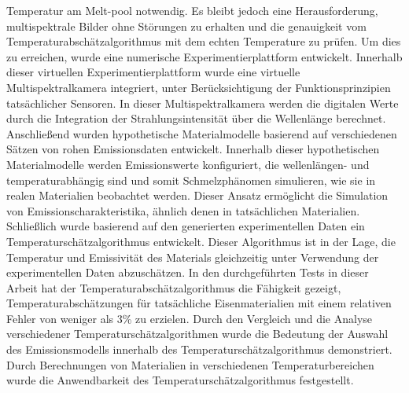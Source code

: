 {	Temperatur am Melt-pool notwendig. Es bleibt jedoch eine Herausforderung, multispektrale 
	Bilder ohne Störungen zu erhalten und die genauigkeit vom Temperaturabschätzalgorithmus mit dem 
	echten Temperature zu prüfen. Um dies zu erreichen, wurde eine numerische 
	Experimentierplattform entwickelt. Innerhalb dieser virtuellen Experimentierplattform 
	wurde eine virtuelle Multispektralkamera integriert, unter Berücksichtigung der 
	Funktionsprinzipien tatsächlicher Sensoren. In dieser Multispektralkamera werden die 
	digitalen Werte durch die Integration der Strahlungsintensität über die Wellenlänge 
	berechnet. Anschließend wurden hypothetische Materialmodelle basierend auf verschiedenen 
	Sätzen von rohen Emissionsdaten entwickelt. Innerhalb dieser hypothetischen Materialmodelle 
	werden Emissionswerte konfiguriert, die wellenlängen- und temperaturabhängig sind und 
	somit Schmelzphänomen simulieren, wie sie in realen Materialien beobachtet werden. 
	Dieser Ansatz ermöglicht die Simulation von Emissionscharakteristika, ähnlich denen in 
	tatsächlichen Materialien. Schließlich wurde basierend auf den generierten experimentellen 
	Daten ein Temperaturschätzalgorithmus entwickelt. Dieser Algorithmus ist in der Lage, 
	die Temperatur und Emissivität des Materials gleichzeitig unter Verwendung der 
	experimentellen Daten abzuschätzen. 
	In den durchgeführten Tests in dieser Arbeit hat der Temperaturabschätzalgorithmus 
	die Fähigkeit gezeigt, Temperaturabschätzungen 
	für tatsächliche Eisenmaterialien mit einem relativen Fehler von weniger als 3\% zu erzielen.
	Durch den Vergleich und die Analyse 
	verschiedener Temperaturschätzalgorithmen wurde die Bedeutung der Auswahl 
	des Emissionsmodells innerhalb des Temperaturschätzalgorithmus demonstriert. 
	Durch Berechnungen von Materialien in verschiedenen Temperaturbereichen wurde die 
	Anwendbarkeit des Temperaturschätzalgorithmus festgestellt.%
	\thispagestyle{empty}
}%
%
%